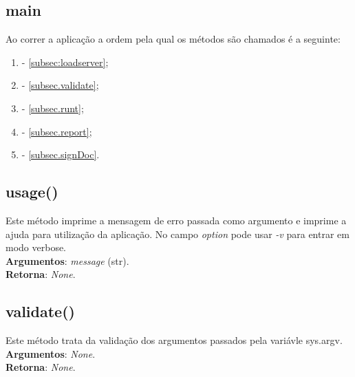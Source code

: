 \documentclass{report}
\begin{document}
\subsection{main}
Ao correr a aplicação a ordem pela qual os métodos são chamados é a seguinte:
\begin{enumerate}
\item {} - \autoref{subsec:loadserver};
\item {} - \autoref{subsec.validate};
\item {} - \autoref{subsec.runt};
\item {} - \autoref{subsec.report};
\item {} - \autoref{subsec.signDoc}.
\end{enumerate}

\subsection{usage()}
\label{subsec.usage}
Este método imprime a mensagem de erro passada como argumento e imprime a ajuda para utilização da aplicação. No campo \textit{option} pode usar \textit{-v} para entrar em modo verbose.\\ 
\textbf{Argumentos}: \textit{message} (str).\\
\textbf{Retorna}: \textit{None}.

\subsection{validate()}
\label{subsec.validate}
Este método trata da validação dos argumentos passados pela variávle sys.argv.\\ 
\textbf{Argumentos}: \textit{None}.\\
\textbf{Retorna}: \textit{None}.
\end{document}
